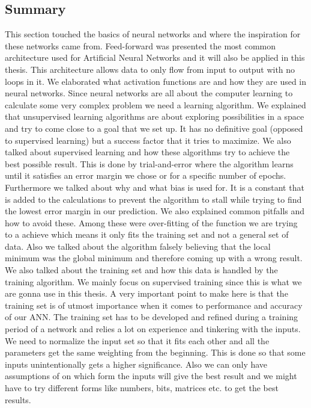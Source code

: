 \subsection{Summary}
This section touched the basics of neural networks and where the inspiration for these networks came from. Feed-forward was presented the most common architecture used for Artificial Neural Networks and  it will also be applied in this thesis. This architecture allows data to only flow from input to output with no loops in it. We elaborated what activation functions are and how they are used in neural networks. Since neural networks are all about the computer learning to calculate some very complex problem we need a learning algorithm. We explained that unsupervised learning algorithms are about exploring possibilities in a space and try to come close to a goal that we set up. It has no definitive goal (opposed to supervised learning) but a success factor that it tries to maximize. We also talked about supervised learning and how these algorithms try to achieve the best possible result. This is done by trial-and-error where the algorithm learns until it satisfies an error margin we chose or for a specific number of epochs. Furthermore we talked about why and what bias is used for. It is a constant that is added to the calculations to prevent the algorithm to stall while trying to find the lowest error margin in our prediction. We also explained common pitfalls and how to avoid these. Among these were over-fitting of the function we are trying to a achieve which means it only fits the training set and not a general set of data. Also we talked about the algorithm falsely believing that the local minimum was the global minimum and therefore coming up with a wrong result.
We also talked about the training set and how this data is handled by the training algorithm. We mainly focus on supervised training since this is what we are gonna use in this thesis. A very important point to make here is that the training set is of utmost importance when it comes to performance and accuracy of our ANN. The training set has to be developed and refined during a training period of a network and relies a lot on experience and tinkering with the inputs. We need to normalize the input set so that it fits each other and all the parameters get the same weighting from the beginning. This is done so that some inputs unintentionally gets a higher significance. Also we can only have assumptions of on which form the inputs will give the best result and we might have to try different forms like numbers, bits, matrices etc. to get the best results.